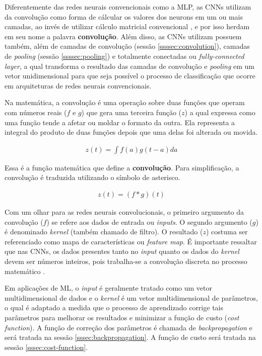 Diferentemente das redes neurais convencionais como a MLP, as CNNs utilizam da convolução como forma de cálcular os valores dos neurons em um ou mais camadas, ao invés de utilizar cálculo matricial convencional \cite{goodfellow-et-al-2016}, e por isso herdam em seu nome a palavra \textbf{convolução}. Além disso, as CNNs utilizam possuem também, além de camadas de convolução (sessão \ref{ssssec:convolution}), camadas de \textit{pooling} (sessão \ref{ssssec:pooling}) e totalmente conectadas ou \textit{fully-connected layer}, a qual transforma o resultado das camadas de convolução e \textit{pooling} em um vetor unidimensional para que seja possível o processo de classificação que ocorre em arquiteturas de redes neurais convencionais.


 \label{ssssec:convolution}
Na matemática, a convolução é uma operação sobre duas funções que operam com números reais (\(f\) e \(g\)) que gera uma terceira função (\(z\)) a qual expressa como uma função tende a afetar ou moldar o formato da outra. Ela representa a integral do produto de duas funções depois que uma delas foi alterada ou movida.

\begin{gather}
  z(t) = \int f(a)g(t - a) da
  \label{math:convolution}
\end{gather}

Essa é a função matemática que define a \textbf{convolução}. Para simplificação, a convolução é traduzida utilizando o símbolo de asterisco.

\begin{gather}
  z(t) = (f * g)(t)
  \label{math:convolution-simplified}
\end{gather}

Com um olhar para as redes neurais convolucionais, o primeiro argumento da convolução (\(f\)) se refere aos dados de entrada ou \textit{inputs}. O segundo argumento (\(g\)) é denominado \textit{kernel} (também chamado de filtro). O resultado (\(z\)) costuma ser referenciado como mapa de características ou \textit{feature map}. É importante ressaltar que nas CNNs, os dados presentes tanto no \textit{input} quanto os dados do \textit{kernel} devem ser números inteiros, pois trabalha-se a convolução discreta no processo matemático \cite{goodfellow-et-al-2016}.

Em aplicações de ML, o \textit{input} é geralmente tratado como um vetor multidimensional de dados e o \textit{kernel} é um vetor multidimensional de parâmetros, o qual é adaptado a medida que o processo de aprendizado corrige tais parâmetros para melhorar os resultados e minimizar a função de custo (\textit{cost function}). A função de correção dos parâmetros é chamada de \textit{backpropagation} e será tratada na sessão \ref{sssec:backpropagation}. A função de custo será tratada na sessão \ref{sssec:cost-function}.

